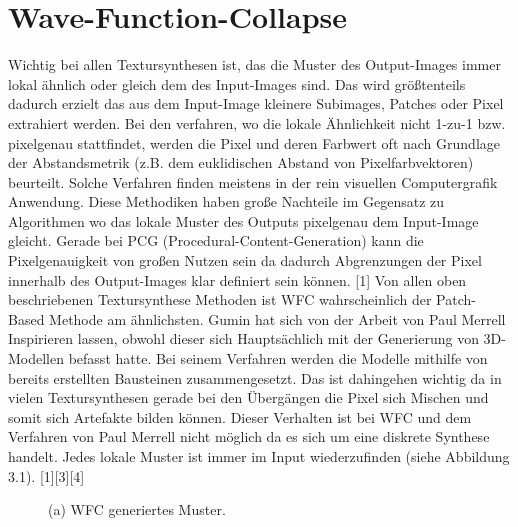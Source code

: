 \documentclass[12pt]{report}
\begin{document}
\chapter{Wave-Function-Collapse}

Wichtig bei allen Textursynthesen ist,
das die Muster des Output-Images immer lokal ähnlich oder gleich dem des Input-Images sind.
Das wird größtenteils dadurch erzielt das aus dem Input-Image kleinere Subimages, Patches oder Pixel extrahiert werden.
Bei den verfahren, wo die lokale Ähnlichkeit nicht 1-zu-1 bzw. pixelgenau stattfindet, werden die Pixel und deren Farbwert oft nach Grundlage der Abstandsmetrik {(z.B. dem euklidischen Abstand von Pixelfarbvektoren)} beurteilt.
Solche Verfahren finden meistens in der rein visuellen Computergrafik Anwendung.
Diese Methodiken haben große Nachteile im Gegensatz zu Algorithmen wo das lokale Muster des Outputs pixelgenau dem Input-Image gleicht.
Gerade bei PCG {(Procedural-Content-Generation)} kann die Pixelgenauigkeit von großen Nutzen sein da dadurch Abgrenzungen der Pixel innerhalb des Output-Images klar definiert sein können. {[1]}
Von allen oben beschriebenen Textursynthese Methoden ist WFC wahrscheinlich der Patch-Based Methode am ähnlichsten.
\newline
Gumin hat sich von der Arbeit von Paul Merrell Inspirieren lassen, obwohl dieser sich Hauptsächlich mit der Generierung von 3D-Modellen befasst hatte.
Bei seinem Verfahren werden die Modelle mithilfe von bereits erstellten Bausteinen zusammengesetzt.
Das ist dahingehen wichtig da in vielen Textursynthesen gerade bei den Übergängen die Pixel sich Mischen und somit sich Artefakte bilden können.
Dieser Verhalten ist bei WFC und dem Verfahren von Paul Merrell nicht möglich da es sich um eine diskrete Synthese handelt.
Jedes lokale Muster ist immer im Input wiederzufinden {(siehe Abbildung 3.1)}. {[1][3][4]}

\begin{figure}[H]
    \centering
    \caption{(a) WFC generiertes Muster.}%
\end{figure}
\end{document}
